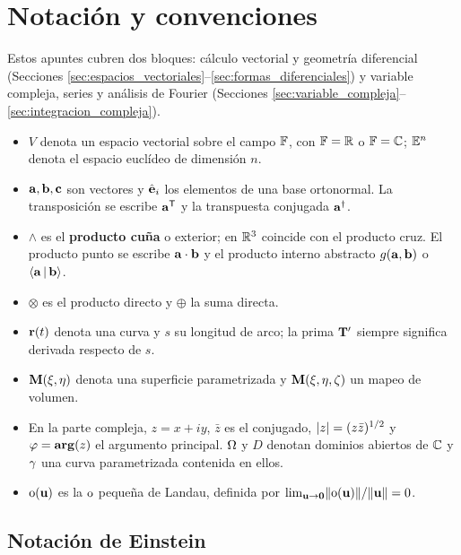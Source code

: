 \section{Notaci\'on y convenciones}
\label{sec:notacion}

Estos apuntes cubren dos bloques: c\'alculo vectorial y geometr\'ia diferencial
(Secciones \ref{sec:espacios_vectoriales}--\ref{sec:formas_diferenciales}) y
variable compleja, series y an\'alisis de Fourier
(Secciones \ref{sec:variable_compleja}--\ref{sec:integracion_compleja}).

\begin{itemize}
  \item $V$ denota un espacio vectorial sobre el campo $\mathbb{F}$, con
        $\mathbb{F}=\mathbb{R}$ o $\mathbb{F}=\mathbb{C}$; $\mathbb{E}^n$ denota el espacio eucl\'ideo de
        dimensi\'on $n$.
  \item $\mathbf{a},\mathbf{b},\mathbf{c}$ son vectores y $\hat{\mathbf{e}}_i$ los elementos de una
        base ortonormal. La transposici\'on se escribe $\mathbf{a}^{\mathsf{T}}$ y la
        transpuesta conjugada $\mathbf{a}^\dagger$.
  \item $\wedge$ es el \textbf{producto cu\~na} o exterior; en $\mathbb{R}^3$ coincide
        con el producto cruz. El producto punto se escribe $\mathbf{a}\cdot\mathbf{b}$
        y el producto interno abstracto $g(\mathbf{a},\mathbf{b})$ o
        $\langle \mathbf{a} \,\vert\, \mathbf{b} \rangle$.
  \item $\otimes$ es el producto directo y $\oplus$ la suma directa.
  \item $\mathbf{r}(t)$ denota una curva y $s$ su longitud de arco; la prima
        $\mathbf{T}'$ siempre significa derivada respecto de $s$.
  \item $\mathbf{M}(\xi,\eta)$ denota una superficie parametrizada y
        $\mathbf{M}(\xi,\eta,\zeta)$ un mapeo de volumen.
  \item En la parte compleja, $z=x+iy$, $\bar z$ es el conjugado,
        $\lvert z \rvert=(z\bar z)^{1/2}$ y $\varphi=\operatorname{\mathbf{arg}}(z)$ el argumento principal.
        $\Omega$ y $D$ denotan dominios abiertos de $\mathbb{C}$ y $\gamma$ una curva
        parametrizada contenida en ellos.
  \item $\mathrm{o}(\mathbf{u})$ es la $\mathrm{o}$ peque\~na de Landau, definida por
        $\lim_{\mathbf{u}\rightarrow\mathbf{0}}\lVert \mathrm{o}(\mathbf{u}) \rVert/\lVert \mathbf{u} \rVert=0$.
\end{itemize}

\subsection{Notaci\'on de Einstein}
\label{subsec:einstein}

